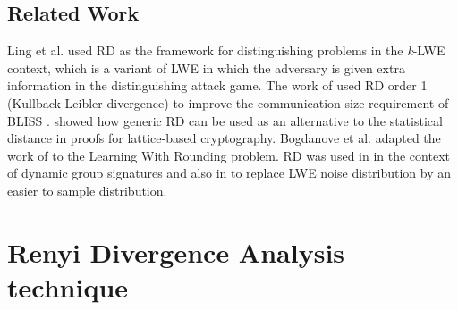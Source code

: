 \subsection{Related Work}
\label{sec:renyiRelatedWorks}
Ling et al. \cite{ling2017hardness} used RD as the framework for distinguishing
problems in the \textit{k}-LWE context, which is a variant of LWE in which the
adversary is given extra information in the distinguishing attack game. The
work of \cite{poppelmann2014enhanced27} used RD order 1 (Kullback-Leibler
divergence) to improve the communication size requirement of BLISS
\cite{ducas2013lattice11}. \cite{bai2015improved5} showed how generic RD can
be used as an alternative to the statistical distance in proofs for
lattice-based cryptography.  Bogdanove et al. \cite{bogdanov2016hardness4}
adapted the work of \cite{bai2015improved5} to the Learning With Rounding
problem. RD was used in \cite{libert2016signature} in the context of dynamic
group signatures and also in \cite{alkim2016post} to replace LWE noise
distribution by an easier to sample distribution.



\section{Renyi Divergence Analysis technique}
\label{sec:secProcRenyi}

